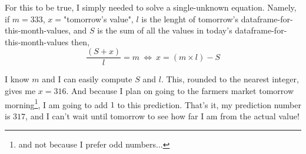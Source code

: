 \documentclass[11pt,a4paper]{article}
\begin{document}
For this to be true, I simply needed to solve a single-unknown equation. Namely, if $m = 333$, $x =$"tomorrow's value", $l$ is the lenght of tomorrow's dataframe-for-this-month-values, and $S$ is the sum of all the values in today's dataframe-for-this-month-values then,
$$
\frac{(S + x)}{l} = m\ \Longleftrightarrow\ x = (m \times l) - S
$$

I know $m$ and I can easily compute $S$ and $l$. This, rounded to the nearest integer, gives me $x = 316$. And because I plan on going to the farmers market tomorrow morning\footnote{and not because I prefer odd numbers...}, I am going to add $1$ to this prediction. That's it, my prediction number is $317$, and I can't wait until tomorrow to see how far I am from the actual value!
\end{document}

